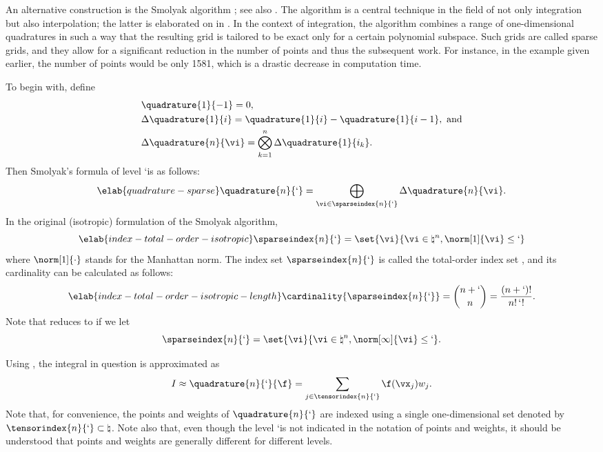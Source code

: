 An alternative construction is the Smolyak algorithm \cite{smolyak1963}; see
also \cite{klimke2006, eldred2008, heiss2008, maitre2010}. The algorithm is a
central technique in the field of not only integration but also interpolation;
the latter is elaborated on in . In the context
of integration, the algorithm combines a range of one-dimensional quadratures in
such a way that the resulting grid is tailored to be exact only for a certain
polynomial subspace. Such grids are called sparse grids, and they allow for a
significant reduction in the number of points and thus the subsequent work. For
instance, in the example given earlier, the number of points would be only 1581,
which is a drastic decrease in computation time.

To begin with, define
\begin{align*}
  & \quadrature{1}{-1} = 0, \\
  & \Delta\quadrature{1}{i} = \quadrature{1}{i} - \quadrature{1}{i - 1}, \text{ and} \\
  & \Delta\quadrature{n}{\vi} = \bigotimes_{k = 1}^n \Delta\quadrature{1}{i_k}.
\end{align*}
Then Smolyak's formula of level \lq is as follows:
\begin{equation} \elab{quadrature-sparse}
  \quadrature{n}{\lq} = \bigoplus_{\vi \in \sparseindex{n}{\lq}} \Delta\quadrature{n}{\vi}.
\end{equation}
In the original (isotropic) formulation of the Smolyak algorithm,
\begin{equation} \elab{index-total-order-isotropic}
  \sparseindex{n}{\lq} = \set{\vi}{\vi \in \natural^n, \norm[1]{\vi} \leq \lq}
\end{equation}
where $\norm[1]{\cdot}$ stands for the Manhattan norm. The index set
$\sparseindex{n}{\lq}$ is called the total-order index set \cite{eldred2008,
beck2011}, and its cardinality can be calculated as follows:
\begin{equation} \elab{index-total-order-isotropic-length}
  \cardinality{\sparseindex{n}{\lq}} = {n + \lq \choose n} = \frac{(n + \lq)!}{n! \, \lq!}.
\end{equation}
Note that  reduces to  if we let
\[
  \sparseindex{n}{\lq} = \set{\vi}{\vi \in \natural^n, \norm[\infty]{\vi} \leq \lq}.
\]

Using , the integral in question is approximated as
\[
  I \approx \quadrature{n}{\lq}{\f}
  = \sum_{j \in \tensorindex{n}{\lq}} \f(\vx_j) w_j.
\]
Note that, for convenience, the points and weights of $\quadrature{n}{\lq}$ are
indexed using a single one-dimensional set denoted by $\tensorindex{n}{\lq}
\subset \natural$. Note also that, even though the level \lq is not indicated in
the notation of points and weights, it should be understood that points and
weights are generally different for different levels.

